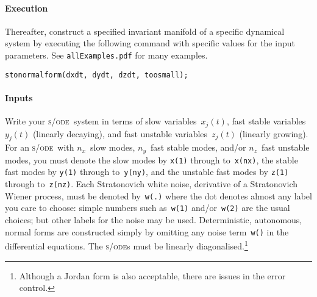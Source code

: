 \documentclass[11pt,a5paper]{article}
\def\sde{\textsc{s/ode}}
\begin{document}
\paragraph{Execution}
Thereafter, construct a specified invariant manifold of a
specific dynamical system by executing the following command
with specific values for the input parameters.  See
\verb|allExamples.pdf| for many examples.
\begin{verbatim}
stonormalform(dxdt, dydt, dzdt, toosmall);
\end{verbatim}


\paragraph{Inputs}
Write your \sde\ system in terms of slow
variables~\(x_j(t)\), fast stable variables~\(y_j(t)\)
(linearly decaying), and fast unstable variables~\(z_j(t)\)
(linearly growing). For an \sde\ with $n_x$~slow modes,
$n_y$~fast stable modes, and/or \(n_z\)~fast unstable modes,
you must denote the slow modes by \verb|x(1)| through
to~\verb|x(nx)|, the stable fast modes by \verb|y(1)|
through to~\verb|y(ny)|, and the unstable fast modes by
\verb|z(1)| through to~\verb|z(nz)|. Each Stratonovich white
noise, derivative of a Stratonovich Wiener process, must be
denoted by~\verb|w(.)| where the dot denotes almost any
label you care to choose: simple numbers such as~\verb|w(1)|
and/or~\verb|w(2)| are the usual choices; but other labels
for the noise may be used. Deterministic, autonomous, normal
forms are constructed simply by omitting any noise
term~\verb|w()| in the differential equations. The \sde{}s
must be linearly diagonalised.\footnote{Although a Jordan
form is also acceptable, there are issues in the error
control.}  
\end{document}
